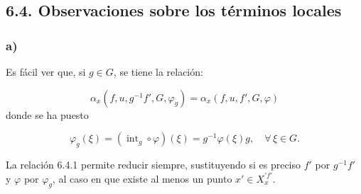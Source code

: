 \subsection*{6.4. Observaciones sobre los términos locales}
\subsubsection*{a)} Es fácil ver que, si $g\in G$, se tiene la relación:

\begin{equation}\tag{6.4.1}
\alpha_x(f,u,g^{-1}f',G,\varphi_g)=\alpha_x(f,u,f',G,\varphi)
\end{equation}
donde se ha puesto

\begin{equation}\tag{6.4.2}
\varphi_g(\xi)=(\operatorname{int}_g\circ\varphi)(\xi)=g^{-1}\varphi(\xi)g,
\quad \forall\,\xi\in G.
\end{equation}

La relación 6.4.1 permite reducir siempre, sustituyendo si es preciso $f'$ por $g^{-1}f'$ y $\varphi$ por $\varphi_g$, al caso en que existe al menos un punto $x'\in X_x^{\prime f'}$.
